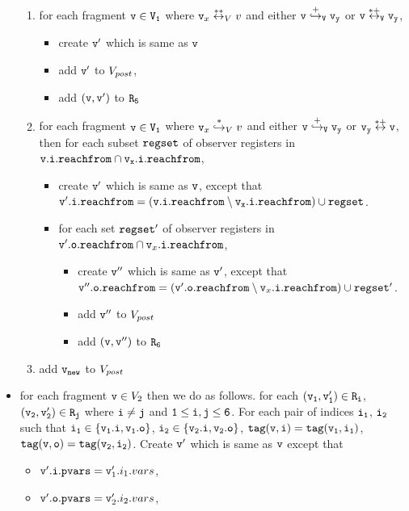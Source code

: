 \begin{itemize}
\begin{enumerate}
\item for each fragment $\tt v \in V_1$ where $\mathtt{v}_x \overset{**}\leftrightarrow_{V} v$ and either $\tt v \overset{+}\hookrightarrow_{V} \mathtt{v}_y$ or $\tt v \overset{*+}\leftrightarrow_{V} \mathtt{v}_y$, 
\begin{itemize}
\item create $\tt v'$ which is same as $\tt v$
\item  add $\tt v'$ to $V_{post}$,
\item add $\tt (v,v')$ to $\tt R_5$

\end{itemize}


\item for each fragment $\tt v \in V_1$ where $\mathtt{v}_x \overset{*}\hookrightarrow_{V} v$ and either $\tt v \overset{+}\hookrightarrow_{V} \mathtt{v}_y$ or $\tt \mathtt{v}_y \overset{*+}\leftrightarrow v$, then for each subset $\mathtt{regset}$ of observer registers in $\tt \mathtt{v}.\mathtt{i}.\mathtt{reachfrom} \cap \mathtt{v}_x.\mathtt{i}.\mathtt{reachfrom}$, 
\begin{itemize}
\item create $\tt v'$ which is same as $\tt v$, except that $\mathtt{v}'.\mathtt{i}.\mathtt{reachfrom} = (\tt \mathtt{v}.\mathtt{i}.\mathtt{reachfrom} \setminus \mathtt{v}_x.\mathtt{i}.\mathtt{reachfrom}) \cup \mathtt{regset}$. 
 \item for each set $\mathtt{regset}'$ of observer registers in $\mathtt{v}'.\mathtt{o}.\mathtt{reachfrom} \cap \mathtt{v}_x.\mathtt{i}.\mathtt{reachfrom}$,  
\begin{itemize}
\item create $\mathtt{v}''$ which is same as $\mathtt{v}'$, except that $\mathtt{v}''.\mathtt{o}.\mathtt{reachfrom} = (\mathtt{v}'.\mathtt{o}.\mathtt{reachfrom} \setminus \mathtt{v}_x.\mathtt{i}.\mathtt{reachfrom}) \cup \mathtt{regset}'$. 
\item add $\mathtt{v}''$ to $V_{post}$
\item add $\tt (v,v'')$ to $\tt R_6$
\end{itemize}
\end{itemize}
\item add $\tt \mathtt{v}_{new}$ to $V_{post}$ 
\end{enumerate}

\item for each fragment $\mathtt{v} \in V_2$ then we do as follows. for each $\tt (\mathtt{v}_1,\mathtt{v}_1') \in R_i$, $\tt (\mathtt{v}_2,\mathtt{v}_2') \in R_j$ where $\tt i \neq j$ and $\tt 1 \leq i,j \leq 6$. For each pair of indices $\tt i_1$, $\tt i_2$ such that $\tt i_1 \in \{\mathtt{v}_1.i, \mathtt{v}_1.o\}$, $\tt i_2 \in \{\mathtt{v}_2.i, \mathtt{v}_2.o\}$, $\tt tag(v,i) = tag(\mathtt{v}_1, i_1)$, $\tt tag(v,o) = tag(\mathtt{v}_2, i_2)$. Create $\mathtt{v}'$ which is same as $\mathtt{v}$ except that 
\begin{itemize}
\item $\mathtt{v}'.\mathtt{i}.\mathtt{pvars} = \mathtt{v}_1'.i_1.vars$,
\item $\mathtt{v}'.\mathtt{o}.\mathtt{pvars} = \mathtt{v}_2'.i_2.vars$,


\end{itemize}
\end{itemize}
